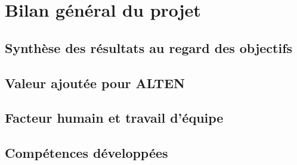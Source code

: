 \chapter{Bilan général du projet}
\chapminitoc

\section{Synthèse des résultats au regard des objectifs}

\section{Valeur ajoutée pour ALTEN}

\section{Facteur humain et travail d'équipe}

\section{Compétences développées}
